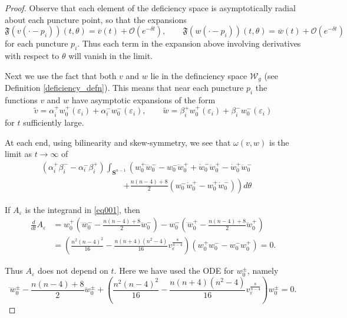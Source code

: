 \documentclass[reqno,11pt]{amsart}
\theoremstyle{tttheorem}
\newcommand{\Ss}{\mathbf{S}}
\begin{document}
\begin{proof}
 Observe that each element of the deficiency space is asymptotically radial about 
 each puncture point, so that the expansions 
 $$\mathfrak{F} (v(\cdot - p_i)) (t,\theta) = \overline{v}(t) + \mathcal{O} (e^{-\delta t}), 
 \qquad \mathfrak{F}(w(\cdot - p_i)) (t,\theta) = \overline{w}(t) + \mathcal{O}(e^{-\delta t})$$
 for each puncture $p_i$. Thus each term in the expansion above involving derivatives with 
 respect to $\theta$ will vanish in the limit. 

 Next we use the fact that both $v$ and $w$ lie in the definciency space 
 $\mathcal{W}_g$ (see Definition \ref{deficiency_defn}). This means that near each puncture $p_i$ the 
 functions $v$ and $w$ have asymptotic expansions of the form 
 \begin{equation} \label{expansion_def_space}
 \widetilde v = \alpha_i^+ w_0^+(\varepsilon_i) + \alpha_i^- w_0^-(\varepsilon_i), \qquad 
 \widetilde w = \beta_i^+ w_0^+(\varepsilon_i) + \beta_i^- w_0^-(\varepsilon_i)  
 \end{equation} 
 for $t$ sufficiently large. 


 At each end, using bilinearity and skew-symmetry, we see that $\omega(v,w)$ is the limit as $t\rightarrow\infty$ of
\begin{eqnarray}\label{eq001}
    (\alpha_i^+\beta_i^--\alpha_i^-\beta_i^+)\int_{\Ss^{n-1}}\left(w_0^+ \dddot {w}_0^- 
     -  w_0^- \dddot {w}_0^+ + \dot {w}_0^- \ddot {w}_0^+ - \dot {w}_0^+ \ddot {w}_0^-
     \right .&& \\ \nonumber 
     \qquad \qquad \qquad \qquad \qquad  \left .  + \frac{n(n-4)+8}{2} (w_0^- \dot {w}_0^+ - w_0^+ \dot {w}_0^-)\right)d\theta & & 
\end{eqnarray}

If $A_\varepsilon$ is the integrand in \eqref{eq001}, then
\begin{align*}
\frac{d}{dt}A_\varepsilon
& = w_0^+ \left(\ddddot w_0^--\frac{n(n-4)+8}{2}\ddot w_0^-\right) - w_0^- \left(\ddddot w_0^+-\frac{n(n-4)+8}{2}\ddot w_0^+\right)\\
& =\left ( 
\frac{n^2(n-4)^2}{16} - \frac{n(n+4)(n^2-4)}{16} v_\varepsilon^{\frac{8}{n-4}} \right )\left(w_0^+w_0^--w_0^-w_0^+\right)=0.
\end{align*}

Thus $A_\varepsilon$ does not depend on $t$. Here we have used the ODE for $w_0^\pm$, namely 
$$\ddddot w_0^\pm - \frac{n(n-4)+8}{2} \ddot w_0^\pm + \left ( 
\frac{n^2(n-4)^2}{16} - \frac{n(n+4)(n^2-4)}{16} v_\varepsilon^{\frac{8}{n-4}} \right ) w_0^\pm 
= 0.$$


\end{proof}
\end{document}
